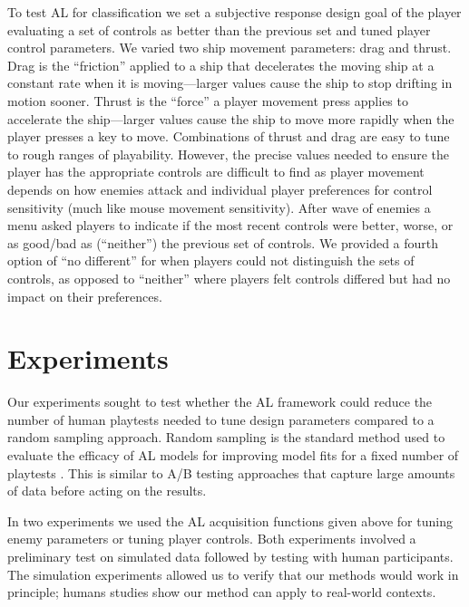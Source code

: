 \documentclass{sig-alternate}
\begin{document}
To test AL for classification we set a subjective response design goal of the player evaluating a set of controls as better than the previous set and tuned player control parameters.
We varied two ship movement parameters: drag and thrust. 
Drag is the ``friction'' applied to a ship that decelerates the moving ship at a constant rate when it is moving---larger values cause the ship to stop drifting in motion sooner. 
Thrust is the ``force'' a player movement press applies to accelerate the ship---larger values cause the ship to move more rapidly when the player presses a key to move. 
%
Combinations of thrust and drag are easy to tune to rough ranges of playability.
However, the precise values needed to ensure the player has the appropriate controls are difficult to find as player movement depends on how enemies attack and individual player preferences for control sensitivity (much like mouse movement sensitivity). 
After wave of enemies a menu asked players to indicate if the most recent controls were better, worse, or as good/bad as (``neither'') the previous set of controls.
We provided a fourth option of ``no different'' for when players could not distinguish the sets of controls, as opposed to ``neither'' where players felt controls differed but had no impact on their preferences.





\section{Experiments}
Our experiments sought to test whether the AL framework could reduce the number of human playtests needed to tune design parameters compared to a random sampling approach.
Random sampling is the standard method used to evaluate the efficacy of AL models for improving model fits for a fixed number of playtests \cite{settles2012:al-book}. This is similar to A/B testing approaches that capture large amounts of data before acting on the results.

In two experiments we used the AL acquisition functions given above for tuning enemy parameters or tuning player controls.
Both experiments involved a preliminary test on simulated data followed by testing with human participants.
The simulation experiments allowed us to verify that our methods would work in principle; humans studies show our method can apply to real-world contexts.
\end{document}
